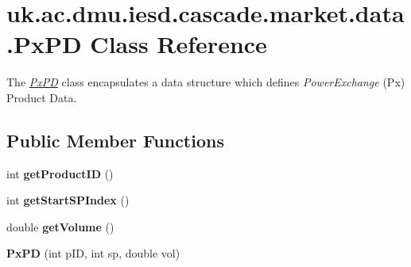 \hypertarget{classuk_1_1ac_1_1dmu_1_1iesd_1_1cascade_1_1market_1_1data_1_1_px_p_d}{\section{uk.\-ac.\-dmu.\-iesd.\-cascade.\-market.\-data.\-Px\-P\-D Class Reference}
\label{classuk_1_1ac_1_1dmu_1_1iesd_1_1cascade_1_1market_1_1data_1_1_px_p_d}
}


The {\itshape \hyperlink{classuk_1_1ac_1_1dmu_1_1iesd_1_1cascade_1_1market_1_1data_1_1_px_p_d}{Px\-P\-D}} class encapsulates a data structure which defines {\itshape Power\-Exchange} (Px) Product Data.  


\subsection*{Public Member Functions}
\begin{DoxyCompactItemize}
\item 
\hypertarget{classuk_1_1ac_1_1dmu_1_1iesd_1_1cascade_1_1market_1_1data_1_1_px_p_d_a666ef290ceb440dc6d04044bf629ec6b}{int {\bfseries get\-Product\-I\-D} ()}\label{classuk_1_1ac_1_1dmu_1_1iesd_1_1cascade_1_1market_1_1data_1_1_px_p_d_a666ef290ceb440dc6d04044bf629ec6b}

\item 
\hypertarget{classuk_1_1ac_1_1dmu_1_1iesd_1_1cascade_1_1market_1_1data_1_1_px_p_d_a56a74313e5b988affc106bdaa19e3fd6}{int {\bfseries get\-Start\-S\-P\-Index} ()}\label{classuk_1_1ac_1_1dmu_1_1iesd_1_1cascade_1_1market_1_1data_1_1_px_p_d_a56a74313e5b988affc106bdaa19e3fd6}

\item 
\hypertarget{classuk_1_1ac_1_1dmu_1_1iesd_1_1cascade_1_1market_1_1data_1_1_px_p_d_af269ed56ff7d31e550567dd4d03a572b}{double {\bfseries get\-Volume} ()}\label{classuk_1_1ac_1_1dmu_1_1iesd_1_1cascade_1_1market_1_1data_1_1_px_p_d_af269ed56ff7d31e550567dd4d03a572b}

\item 
\hypertarget{classuk_1_1ac_1_1dmu_1_1iesd_1_1cascade_1_1market_1_1data_1_1_px_p_d_ab89317836f8425ee287fe5b1c4ab3453}{{\bfseries Px\-P\-D} (int p\-I\-D, int sp, double vol)}\label{classuk_1_1ac_1_1dmu_1_1iesd_1_1cascade_1_1market_1_1data_1_1_px_p_d_ab89317836f8425ee287fe5b1c4ab3453}

\end{DoxyCompactItemize}


